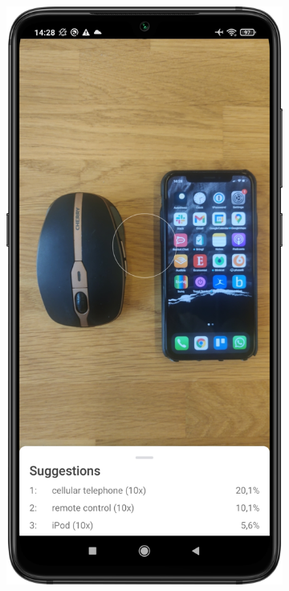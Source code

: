 \documentclass[
			   fontsize=11pt,
               paper=a4,
               bibliography=totoc,
               idxtotoc,
               headsepline,
               footsepline,
               footinclude=false,
               BCOR=12mm,
               DIV=13,
               openany,   %
               ]
               {scrbook}
\begin{document}
\begin{figure}[H]
	\centering
	\begin{subfigure}{.23\textwidth}
		\centering
		\includegraphics[width=\linewidth]{figures/app_class_old.png}

\end{subfigure}
\end{figure}
\end{document}

